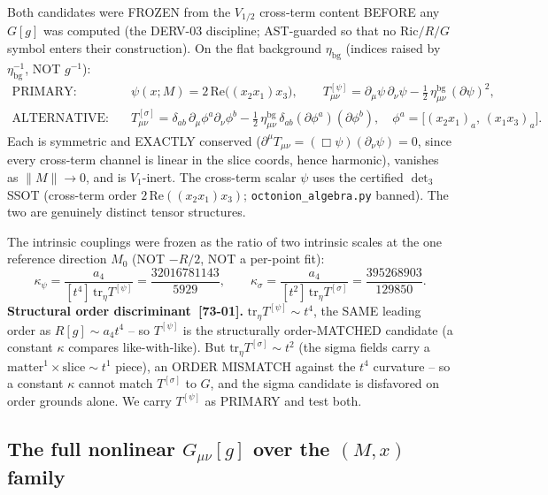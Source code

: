 Both candidates were FROZEN from the $V_{1/2}$ cross-term content BEFORE any $G[g]$ was
computed (the DERV-03 discipline; AST-guarded so that no $\mathrm{Ric}/R/G$ symbol enters
their construction). On the flat background $\eta_{\mathrm{bg}}$ (indices raised by
$\eta_{\mathrm{bg}}^{-1}$, NOT $g^{-1}$):
\begin{align}
  \text{PRIMARY:}\quad
  &\psi(x;M)=2\,\mathrm{Re}\big((x_2 x_1)x_3\big),\qquad
   T^{[\psi]}_{\mu\nu}=\partial_\mu\psi\,\partial_\nu\psi
     -\tfrac12\,\eta^{\mathrm{bg}}_{\mu\nu}\,(\partial\psi)^2,
   \label{eq:Tpsi}\\
  \text{ALTERNATIVE:}\quad
  &T^{[\sigma]}_{\mu\nu}=\delta_{ab}\,\partial_\mu\phi^a\partial_\nu\phi^b
     -\tfrac12\,\eta^{\mathrm{bg}}_{\mu\nu}\,\delta_{ab}(\partial\phi^a)(\partial\phi^b),
   \quad \phi^a=\big[(x_2x_1)_a,\,(x_1x_3)_a\big].
   \label{eq:Tsigma}
\end{align}
Each is symmetric and EXACTLY conserved ($\partial^\mu T_{\mu\nu}=(\Box\psi)(\partial_\nu
\psi)=0$, since every cross-term channel is linear in the slice coords, hence harmonic),
vanishes as $\|M\|\to0$, and is $V_1$-inert. The cross-term scalar $\psi$ uses the
certified $\det_3$ SSOT (cross-term order $2\,\mathrm{Re}((x_2 x_1)x_3)$;
\texttt{octonion\_algebra.py} banned). The two are genuinely distinct tensor structures.

The intrinsic couplings were frozen as the ratio of two intrinsic scales at the one
reference direction $M_0$ (NOT $-R/2$, NOT a per-point fit):
\begin{equation}
  \kappa_\psi=\frac{a_4}{[t^4]\,\mathrm{tr}_\eta T^{[\psi]}}=\frac{32016781143}{5929},
  \qquad
  \kappa_\sigma=\frac{a_4}{[t^2]\,\mathrm{tr}_\eta T^{[\sigma]}}=\frac{395268903}{129850}.
  \label{eq:kappas}
\end{equation}
\textbf{Structural order discriminant~[73-01].} $\mathrm{tr}_\eta T^{[\psi]}\sim t^4$,
the SAME leading order as $R[g]\sim a_4 t^4$ -- so $T^{[\psi]}$ is the structurally
order-MATCHED candidate (a constant $\kappa$ compares like-with-like). But
$\mathrm{tr}_\eta T^{[\sigma]}\sim t^2$ (the sigma fields carry a $\text{matter}^1\times
\text{slice}\sim t^1$ piece), an ORDER MISMATCH against the $t^4$ curvature -- so a
constant $\kappa$ cannot match $T^{[\sigma]}$ to $G$, and the sigma candidate is
disfavored on order grounds alone. We carry $T^{[\psi]}$ as PRIMARY and test both.

\subsection{The full nonlinear $G_{\mu\nu}[g]$ over the $(M,x)$ family}

